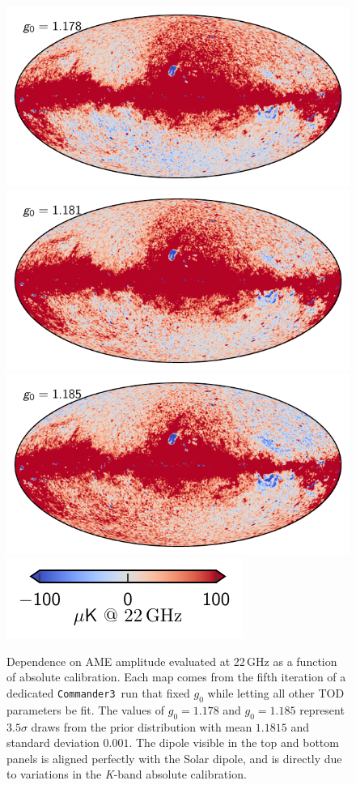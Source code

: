 \documentclass[twocolumn]{../../common/aa}
\def\commanderthree{\texttt{Commander3}}
\newcommand{\K}[0]{\textit K}
\begin{document}
\begin{figure}
	\centering
	\includegraphics[width=\columnwidth]{figures/ame_g01_178.pdf}
	\includegraphics[width=\columnwidth]{figures/ame_g01_181.pdf}
	\includegraphics[width=\columnwidth]{figures/ame_g01_185.pdf}
	\includegraphics[width=0.5\columnwidth]{figures/cbar_100uK.pdf}
	\caption{Dependence on AME amplitude evaluated at 22\,GHz as a function of absolute calibration. Each map comes from the fifth iteration of a dedicated \commanderthree\ run that fixed $g_0$ while letting all other TOD parameters be fit. The values of $g_0=1.178$ and $g_0=1.185$ represent $3.5\sigma$ draws from the prior distribution with mean $1.1815$ and standard deviation $0.001$. The dipole visible in the top and bottom panels is aligned perfectly with the Solar dipole, and is directly due to variations in the \K-band absolute calibration.}
	\label{fig:g0_ame}
\end{figure}
\end{document}
